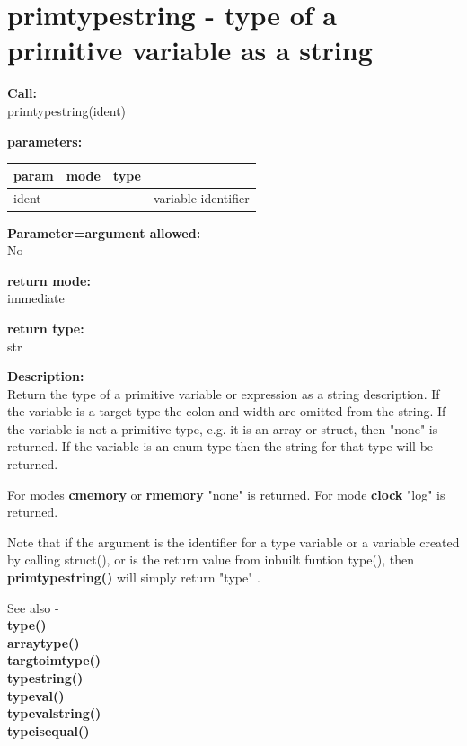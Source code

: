     \section{primtypestring - type of a primitive variable as a string}\label{sec:ifprimtypestring}
        
        {\bf Call:} \\
        primtypestring(ident)
        
        {\bf parameters:} \\
        \begin{tabular}{| l | l | l | l |}
        \hline
        param  & mode & type & \\
        \hline \hline
        ident & - &  -  & variable identifier \\ \hline
        \end{tabular}
        
        {\bf Parameter=argument allowed:} \\
        No
        
        {\bf return mode:} \\
        immediate

        {\bf return type:} \\
        str
        
        {\bf Description:} \\
        Return the type of a primitive variable or expression as a string
        description. If the variable is a target type the colon and width are
        omitted from the string. If the variable is not a primitive type, e.g. it
        is an array or struct, then "none" is returned. If the variable is
        an enum type then the string for that type will be returned.
        
        For modes {\bf cmemory} or {\bf rmemory} "none" is returned. For
        mode {\bf clock} "log" is returned.
        
        Note that if the argument is the identifier for a type variable or
        a variable created by calling struct(), or is the return value from
        inbuilt funtion type(), then
        {\bf primtypestring()} will simply return "type" .


        See also - \\
        {\bf type()}  \\
        {\bf arraytype()}  \\
        {\bf targtoimtype()}  \\
        {\bf typestring()}  \\
        {\bf typeval()}  \\
        {\bf typevalstring()}  \\
        {\bf typeisequal()}  \\
 

